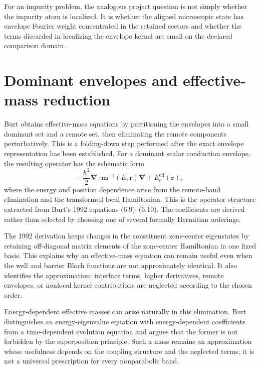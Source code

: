 For an impurity problem, the analogous project question is not simply whether
the impurity atom is localized. It is whether the aligned microscopic state has
envelope Fourier weight concentrated in the retained sectors and whether the
terms discarded in localizing the envelope kernel are small on the declared
comparison domain.

\section{Dominant envelopes and effective-mass reduction}

Burt obtains effective-mass equations by partitioning the envelopes into a
small dominant set and a remote set, then eliminating the remote components
perturbatively. This is a folding-down step performed after the exact envelope
representation has been established. For a dominant scalar conduction envelope,
the resulting operator has the schematic form
\begin{equation}
  -\frac{\hbar^2}{2}
  \boldsymbol\nabla\mathbin{\cdot}
  \mathbf m^{-1}(E,\mathbf r)
  \boldsymbol\nabla
  +E_c^{\mathrm{eff}}(\mathbf r),
  \label{eq:burt-position-dependent-mass}
\end{equation}
where the energy and position dependence arise from the remote-band elimination
and the transformed local Hamiltonian. This is the operator structure extracted
from Burt's 1992 equations (6.9)--(6.10). The coefficients are derived rather
than selected by choosing one of several formally Hermitian orderings.

The 1992 derivation keeps changes in the constituent zone-center eigenstates by
retaining off-diagonal matrix elements of the zone-center Hamiltonian in one
fixed basis. This explains why an effective-mass equation can remain useful even
when the well and barrier Bloch functions are not approximately identical. It
also identifies the approximation: interface terms, higher derivatives, remote
envelopes, or nonlocal kernel contributions are neglected according to the
chosen order.

Energy-dependent effective masses can arise naturally in this elimination. Burt
distinguishes an energy-eigenvalue equation with energy-dependent coefficients
from a time-dependent evolution equation and argues that the former is not
forbidden by the superposition principle. Such a mass remains an approximation
whose usefulness depends on the coupling structure and the neglected terms; it
is not a universal prescription for every nonparabolic band.

